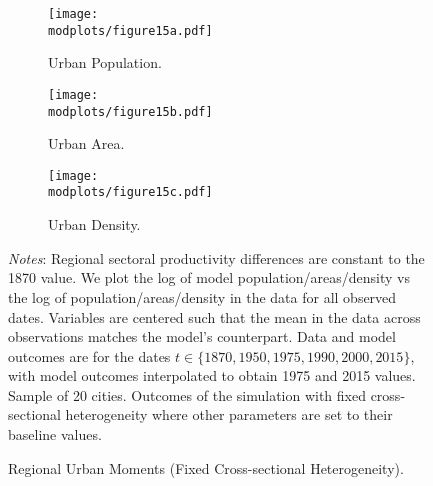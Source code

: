 \documentclass[./20250130-paper.tex]{subfiles}
\begin{document}
\begin{figure}[p!]
	\begin{adjustbox}{center}
		\begin{subfigure}{\pthree\textwidth}
			\texttt{[image: \\modplots/figure15a.pdf]}
			\caption{Urban Population.\label{fig:model-data-Lu-fixedcross}}
		\end{subfigure}
		\begin{subfigure}{\pthree\textwidth}
			\texttt{[image: \\modplots/figure15b.pdf]}
			\caption{Urban Area.\label{fig:model-data-area-fixedcross}}
		\end{subfigure}
		\begin{subfigure}{\pthree\textwidth}
			\texttt{[image: \\modplots/figure15c.pdf]}
			\caption{Urban Density.\label{fig:model-data-density-fixedcross}}
		\end{subfigure}
	\end{adjustbox}
	\caption{Regional Urban Moments (Fixed Cross-sectional Heterogeneity).\label{fig:model-data-fixedcross}}
	
	{\footnotesize \textit{Notes}: Regional sectoral productivity differences  are constant to the 1870 value. We plot the log of model population/areas/density vs the log of population/areas/density in the data for all observed dates. Variables are centered such that the mean in the data across observations matches the model's counterpart. Data and model outcomes are for the dates $t \in \{1870, 1950, 1975, 1990, 2000, 2015 \}$, with model outcomes interpolated to obtain 1975 and 2015 values. Sample of 20 cities. Outcomes of the simulation with fixed cross-sectional heterogeneity where other parameters are set to their baseline values.}
\end{figure}
\end{document}
